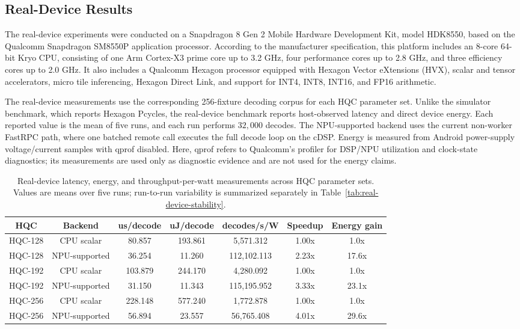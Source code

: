 \subsection{Real-Device Results}

The real-device experiments were conducted on a Snapdragon\textregistered{} 8 Gen 2 Mobile Hardware Development Kit, model HDK8550, based on the Qualcomm
Snapdragon SM8550P application processor. According to the manufacturer specification, this platform includes an 8-core 64-bit Kryo CPU, consisting of
one Arm Cortex-X3 prime core up to 3.2 GHz, four performance cores up to 2.8 GHz, and three efficiency cores up to 2.0 GHz. It also includes a Qualcomm
Hexagon processor equipped with Hexagon Vector eXtensions (HVX), scalar and tensor accelerators, micro tile inferencing, Hexagon Direct Link, and support
for INT4, INT8, INT16, and FP16 arithmetic.

The real-device measurements use the corresponding 256-fixture decoding corpus for each HQC parameter set. Unlike the simulator benchmark, which reports
Hexagon Pcycles, the real-device benchmark reports host-observed latency and direct device energy. Each reported value is the mean of five runs, and
each run performs \(32{,}000\) decodes. The NPU-supported backend uses the current non-worker FastRPC path, where one batched remote call executes the
full decode loop on the cDSP. Energy is measured from Android power-supply voltage/current samples with qprof disabled. Here, qprof refers to Qualcomm's profiler for DSP/NPU
utilization and clock-state diagnostics; its measurements are used only as diagnostic evidence and are not used for the energy claims.

\begin{table}[htbp]
\centering
\renewcommand{\arraystretch}{1.15}
\small

\begin{tabular}{|c|c|c|c|c|c|c|}
\hline
\textbf{HQC} & \textbf{Backend} & \textbf{us/decode} & \textbf{uJ/decode} &
\textbf{decodes/s/W} & \textbf{Speedup} & \textbf{Energy gain} \\
\hline
HQC-128 & CPU scalar    & 80.857  & 193.861 & 5,571.312  & 1.00x & 1.0x  \\
\hline
HQC-128 & NPU-supported & 36.254  & 11.260  & 112,102.113 & 2.23x & 17.6x \\
\hline
HQC-192 & CPU scalar    & 103.879 & 244.170 & 4,280.092  & 1.00x & 1.0x  \\
\hline
HQC-192 & NPU-supported & 31.150  & 11.343  & 115,195.952 & 3.33x & 23.1x \\
\hline
HQC-256 & CPU scalar    & 228.148 & 577.240 & 1,772.878  & 1.00x & 1.0x  \\
\hline
HQC-256 & NPU-supported & 56.894  & 23.557  & 56,765.408 & 4.01x & 29.6x \\
\hline
\end{tabular}
\vspace{0.5em}
\caption{Real-device latency, energy, and throughput-per-watt measurements across HQC parameter sets. Values are means over five runs; run-to-run variability is summarized separately in Table~\ref{tab:real-device-stability}.}
\label{tab:real-device-latency-energy}
\end{table}

